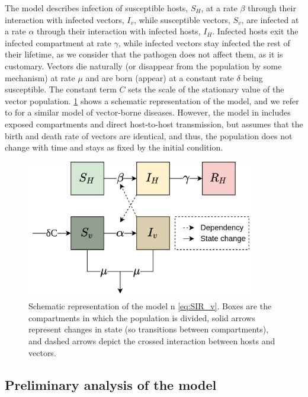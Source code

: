 The model describes infection of susceptible hosts, $S_H$, at a rate
$\beta$ through their interaction with infected vectors, $I_v$, while
susceptible vectors, $S_v$, are infected at a rate $\alpha$ through their
interaction with infected hosts, $I_H$. Infected hosts exit the infected
compartment at rate $\gamma$, while infected vectors stay infected the rest of
their lifetime, as we consider that the pathogen does not affect them, as it is
customary. Vectors die naturally (or disappear from the population by some
mechanism) at rate $\mu$ and are born (appear) at a constant rate $\delta$
being susceptible. The constant term $C$ sets the scale of the stationary value
of the vector population. \cref{fig:model_diagram} shows a schematic
representation of the model, and we refer to \cite{Brauer2016} for a similar
model of vector-borne diseases. However, the model in \cite{Brauer2016}
includes exposed compartments and direct host-to-host transmission, but assumes
that the birth and death rate of vectors are identical, and thus, the
population does not change with time and stays as fixed by the initial
condition.
\begin{figure}[H]
    \centering
    \includegraphics[width=0.9\textwidth]{Figures/Diagram.png}
    \caption[Diagram of the model]{Schematic representation of the model n
        \cref{eq:SIR_v}. Boxes
        are the compartments in which the population is divided, solid arrows
        represent
        changes in state (so transitions between compartments), and dashed
        arrows
        depict the crossed interaction between hosts and vectors.}
    \label{fig:model_diagram}
\end{figure}

\subsection{Preliminary analysis of the model} \label{sec:Prelimanalysis}

